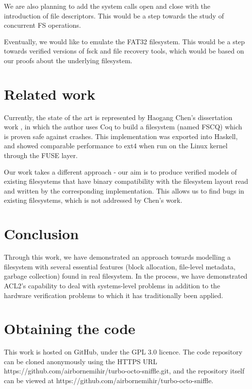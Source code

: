 \documentclass[format=sigconf,review=true]{acmart}
\begin{document}
We are also planning to add the system calls open and close with the
introduction of file descriptors. This would be a step towards the
study of concurrent FS operations.

Eventually, we would like to emulate the FAT32 filesystem. This would
be a step towards verified versions of fsck and file recovery tools,
which would be based on our proofs about the underlying filesystem.

\section{Related work}
Currently, the state of the art is represented by Haogang
Chen's dissertation work \cite{DBLP:conf/usenix/ChenZCCKZ16}, in which
the author uses Coq to build a filesystem (named FSCQ) which is proven
safe against crashes. This implementation was exported into Haskell,
and showed comparable performance to ext4 when run on the Linux kernel
through the FUSE layer.

Our work takes a different approach - our aim is to produce verified
models of existing filesystems that have binary compatibility with the
filesystem layout read and written by the corresponding
implementation. This allows us to find bugs in existing filesystems,
which is not addressed by Chen's work.

\section{Conclusion}
Through this work, we have demonstrated an approach towards modelling
a filesystem with several essential features (block allocation,
file-level metadata, garbage collection) found in real filesystem. In
the process, we have demonstrated ACL2's capability to deal with
systems-level problems in addition to the hardware verification
problems to which it has traditionally been applied.

\section{Obtaining the code}
This work is hosted on GitHub, under the GPL 3.0 licence. The code
repository can be cloned anonymously using the HTTPS URL
https://github.com/airbornemihir/turbo-octo-sniffle.git, and the
repository itself can be viewed at
https://github.com/airbornemihir/turbo-octo-sniffle.



\end{document}
